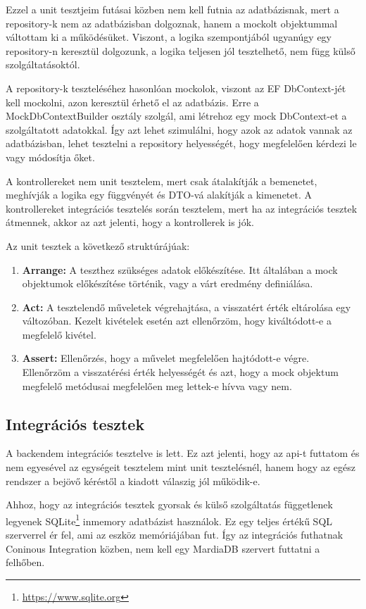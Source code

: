 Ezzel a unit tesztjeim futásai közben nem kell futnia az adatbázisnak, mert a repository-k nem az adatbázisban dolgoznak, hanem a mockolt objektummal váltottam ki a működésüket. Viszont, a logika szempontjából ugyanúgy egy repository-n keresztül dolgozunk, a logika teljesen jól tesztelhető, nem függ külső szolgáltatásoktól.

A repository-k teszteléséhez hasonlóan mockolok, viszont az EF DbContext-jét kell mockolni, azon keresztül érhető el az adatbázis. Erre a MockDbContextBuilder osztály szolgál, ami létrehoz egy mock DbContext-et a szolgáltatott adatokkal. Így azt lehet szimulálni, hogy azok az adatok vannak az adatbázisban, lehet tesztelni a repository helyességét, hogy megfelelően kérdezi le vagy módosítja őket.

A kontrollereket nem unit tesztelem, mert csak átalakítják a bemenetet, meghívják a logika egy függvényét és DTO-vá alakítják a kimenetet. A kontrollereket integrációs tesztelés során tesztelem, mert ha az integrációs tesztek átmennek, akkor az azt jelenti, hogy a kontrollerek is jók.

Az unit tesztek a következő struktúrájúak:
\begin{enumerate}
	\item \textbf{Arrange:} A teszthez szükséges adatok előkészítése. Itt általában a mock objektumok előkészítése történik, vagy a várt eredmény definiálása.
	\item \textbf{Act:} A tesztelendő műveletek végrehajtása, a visszatért érték eltárolása egy változóban. Kezelt kivételek esetén azt ellenőrzöm, hogy kiváltódott-e a megfelelő kivétel.
	\item \textbf{Assert:} Ellenőrzés, hogy a művelet megfelelően hajtódott-e végre. Ellenőrzöm a visszatérési érték helyességét és azt, hogy a mock objektum megfelelő metódusai megfelelően meg lettek-e hívva vagy nem.
\end{enumerate}

\subsection{Integrációs tesztek}
\label{sec:integrationTests}
A backendem integrációs tesztelve is lett. Ez azt jelenti, hogy az api-t futtatom és nem egyesével az egységeit tesztelem mint unit tesztelésnél, hanem hogy az egész rendszer a bejövő kéréstől a kiadott válaszig jól működik-e.

Ahhoz, hogy az integrációs tesztek gyorsak és külső szolgáltatás függetlenek legyenek SQLite\footnote{\url{https://www.sqlite.org}} inmemory adatbázist használok. Ez egy teljes értékű SQL szerverrel ér fel, ami az eszköz memóriájában fut. Így az integrációs futhatnak Coninous Integration közben, nem kell egy MardiaDB szervert futtatni a felhőben.

